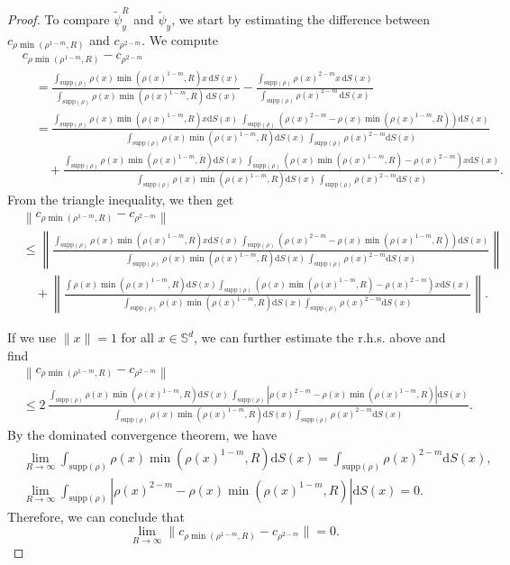 \documentclass[10pt,a4paper]{amsart}
\newcommand{\bbs}{\mathbb S}
\newcommand{\dm}{d} %
\newcommand{\dx}{\mathrm{d}S (x)}
\newcommand{\supp}{\mathrm{supp}(\rho)}
\begin{document}
\begin{proof}
To compare $\tilde{\psi}_y^R$ and $\tilde{\psi}_y$, we start by estimating the difference between $c_{\rho\min(\rho^{1-m},R)}$ and $c_{\rho^{2-m}}$. We compute
\begin{align*}
&c_{\rho\min(\rho^{1-m}, R)}-c_{\rho^{2-m}}\\[3pt]
&\quad = \frac{\int_{\supp}\rho(x)\min(\rho(x)^{1-m},R)x \, \dx}{\int_{\supp}\rho(x)\min(\rho(x)^{1-m},R)\, \dx}-\frac{\int_{\supp}\rho(x)^{2-m}x \, \dx}{\int_{\supp}\rho(x)^{2-m} \, \dx}\\[3pt]
&\quad = \frac{\int_{\supp} \rho(x)\min(\rho(x)^{1-m},R)x\dx \; \int_{\supp} \left(\rho(x)^{2-m}-\rho(x)\min(\rho(x)^{1-m},R) \right)\dx
}{\int_{\supp}\rho(x)\min(\rho(x)^{1-m},R)\dx \, \int_{\supp}\rho(x)^{2-m}\dx}\\[3pt]
&\qquad + \frac{\int_{\supp}\rho(x)\min(\rho(x)^{1-m},R)\dx \,\int_{\supp} \left(\rho(x)\min(\rho(x)^{1-m},R)-\rho(x)^{2-m} \right)x \dx
}{\int_{\supp}\rho(x)\min(\rho(x)^{1-m},R)\dx \, \int_{\supp}\rho(x)^{2-m}\dx}.
\end{align*}
From the triangle inequality, we then get
\begin{align*}
&\left \|c_{\rho\min(\rho^{1-m}, R)}-c_{\rho^{2-m}} \right\|\\[3pt]
&\leq\left\|\frac{\int_{\supp} \rho(x)\min(\rho(x)^{1-m},R)x\dx \, \int_{\supp} \left(\rho(x)^{2-m}-\rho(x)\min(\rho(x)^{1-m},R)\right)\dx
}{\int_{\supp}\rho(x)\min(\rho(x)^{1-m},R)\dx\, \int_{\supp}\rho(x)^{2-m}\dx}\right\|\\[3pt]
&\quad +\left\|\frac{\int\rho(x)\min(\rho(x)^{1-m},R)\dx\int_{\supp}\left(\rho(x)\min(\rho(x)^{1-m},R)-\rho(x)^{2-m} \right) x \dx
}{\int_{\supp}\rho(x)\min(\rho(x)^{1-m},R)\dx\int_{\supp}\rho(x)^{2-m}\dx}\right\|.
\end{align*}

If we use $\|x\|=1$ for all $x\in\bbs^\dm$, we can further estimate the r.h.s. above and find
\begin{align*}
&\left \|c_{\rho\min(\rho^{1-m}, R)}-c_{\rho^{2-m}} \right\|\\[3pt]
&\leq 2 \, \frac{\int_{\supp}\rho(x)\min(\rho(x)^{1-m},R)\dx \, \int_{\supp}|\rho(x)^{2-m}-\rho(x)\min(\rho(x)^{1-m},R)|\dx}{\int_{\supp}\rho(x)\min(\rho(x)^{1-m},R)\dx\int_{\supp}\rho(x)^{2-m}\dx}.
\end{align*}
By the dominated convergence theorem, we have
\begin{equation}
\label{eqn:2limR}
\begin{aligned}
&\lim_{R\to\infty}\int_{\supp}\rho(x)\min(\rho(x)^{1-m},R)\dx =\int_{\supp}\rho(x)^{2-m}\dx,\\
&\lim_{R\to\infty}\int_{\supp}|\rho(x)^{2-m}-\rho(x)\min(\rho(x)^{1-m},R)|\dx=0.
\end{aligned}
\end{equation}
Therefore, we can conclude that
\begin{equation}
\label{eqn:limR-normc}
\lim_{R\to\infty}\|c_{\rho\min(\rho^{1-m}, R)}-c_{\rho^{2-m}}\|=0.
\end{equation}


\end{proof}
\end{document}
